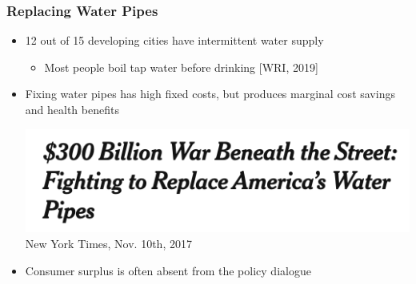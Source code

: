 \documentclass[aspectratio=32]{beamer}
\begin{document}
\begin{frame}
\frametitle{Replacing Water Pipes}
\centering



\begin{itemize}
  \item 12 out of 15 developing cities have intermittent water supply 
    \begin{itemize}
      \item Most people boil tap water before drinking [WRI, 2019]
    \end{itemize}
  \vspace{2mm}
  \item Fixing water pipes has high fixed costs, but produces marginal cost savings and health benefits
  \vspace{2mm}
\begin{center}
\includegraphics[scale=.5]{tables/nytimespic.png} \\
New York Times, Nov. 10th, 2017
\end{center}
  \vspace{2mm}

  \item Consumer surplus is often absent from the policy dialogue 

\end{itemize}
\end{frame}


\end{document}
